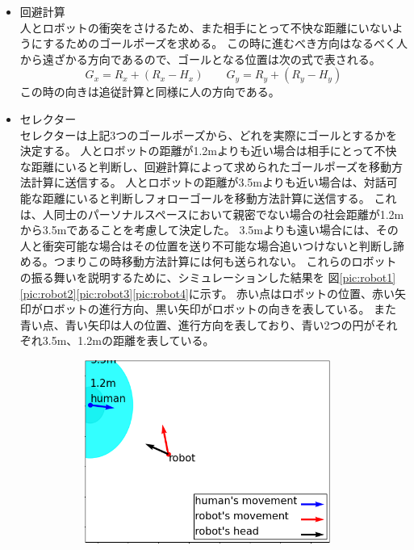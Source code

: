 \documentclass{kuisthesis}
\begin{document}
\begin{itemize}
  \item 回避計算 \\
  人とロボットの衝突をさけるため、また相手にとって不快な距離にいないようにするためのゴールポーズを求める。
  この時に進むべき方向はなるべく人から遠ざかる方向であるので、ゴールとなる位置は次の式で表される。
  \begin{equation}
    G_x = R_x + (R_x - H_x) \qquad G_y = R_y + (R_y - H_y)
  \end{equation}
  この時の向きは追従計算と同様に人の方向である。
  \item セレクター \\
  セレクターは上記3つのゴールポーズから、どれを実際にゴールとするかを決定する。
  人とロボットの距離が1.2mよりも近い場合は相手にとって不快な距離にいると判断し、回避計算によって求められたゴールポーズを移動方法計算に送信する。
  人とロボットの距離が3.5mよりも近い場合は、対話可能な距離にいると判断しフォローゴールを移動方法計算に送信する。
  これは、人同士のパーソナルスペースにおいて親密でない場合の社会距離が1.2mから3.5mであることを考慮して決定した。
  3.5mよりも遠い場合には、その人と衝突可能な場合はその位置を送り不可能な場合追いつけないと判断し諦める。つまりこの時移動方法計算には何も送られない。
  これらのロボットの振る舞いを説明するために、シミュレーションした結果を
  図\ref{pic:robot1}\ref{pic:robot2}\ref{pic:robot3}\ref{pic:robot4}に示す。
  赤い点はロボットの位置、赤い矢印がロボットの進行方向、黒い矢印がロボットの向きを表している。
  また青い点、青い矢印は人の位置、進行方向を表しており、青い2つの円がそれぞれ3.5m、1.2mの距離を表している。
\begin{figure}[H]
  \begin{subfigure}{0.5\textwidth}
    \includegraphics[width=0.95\textwidth]{img/simulation1.png}

\end{subfigure}
\end{figure}
\end{itemize}
\end{document}
